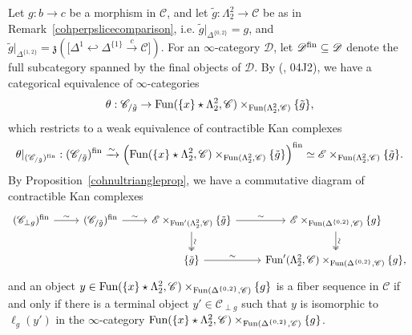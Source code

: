\documentclass{tac}
\newcommand{\f}[1]{\mathfrak{#1}}
\newcommand{\s}[1]{\mathscr{#1}}
\newcommand{\tx}[1]{\textnormal{#1}}
\begin{document}
\begin{rmk}
Let $g : b\to c$ be a morphism in $\s{C}$, and let $\tilde{g} : \Lambda^2_2 \to \s{C}$ be as in Remark~\ref{cohperpslicecomparison}, i.e. $\tilde{g}|_{\Delta^{\{0,2 \}}} =g$, and $\tilde{g}|_{\Delta^{\{1,2\}}} = \f{z} ( \big[ \Delta^1 \hookleftarrow \Delta^{\{1 \}} \xrightarrow{c} \s{C} \big] )$.  For an $\infty$-category $\s{D}$, let $\s{D}^\tx{fin} \subseteq \s{D}$ denote the full subcategory spanned by the final objects of $\s{D}$.  By (\cite{kerodon}, 04J2), we have a categorical equivalence of $\infty$-categories
\[ \theta : \s{C}_{/\tilde{g}} \to \tx{Fun}(\{ x \}\star \Lambda^2_2 ,  \s{C})\times_{\tx{Fun}(\Lambda^2_2 ,  \s{C})} \{ \tilde{g} \}, \]
which restricts to a weak equivalence of contractible Kan complexes
\[ \theta |_{(\s{C}_{/\tilde{g}})^\tx{fin}} : (\s{C}_{/\tilde{g}})^\tx{fin} \xrightarrow{\sim} \Big( \tx{Fun}(\{ x \}\star \Lambda^2_2 ,  \s{C})\times_{\tx{Fun}(\Lambda^2_2 ,  \s{C})} \{ \tilde{g} \} \Big)^\tx{fin} \simeq \s{E} \times_{\tx{Fun}(\Lambda^2_2 ,  \s{C})} \{ \tilde{g} \}. \]
By Proposition~\ref{cohnultriangleprop}, we have a commutative diagram of contractible Kan complexes
\[ \begin{tikzcd}
(\s{C}_{\perp g})^\tx{fin} \arrow[]{r}{\sim} & (\s{C}_{/\tilde{g}})^\tx{fin} \arrow[]{r}{\sim} &  \s{E}  \times_{ \tx{Fun}' (\Lambda^2_2 , \s{C}) } \{ \tilde{g} \} \arrow[]{r}{\sim} \arrow[two heads]{d}{\rotatebox[origin=c]{90}{$\sim$}} & \s{E} \times_{\tx{Fun}(\Delta^{\{0,2 \}} , \s{C})}   \{ g \} \arrow[two heads]{d}{\rotatebox[origin=c]{90}{$\sim$}} \\
& & \{ \tilde{g} \} \arrow[]{r}{\sim} & \tx{Fun}' (\Lambda^2_2 , \s{C})  \times_{\tx{Fun}(\Delta^{\{0,2 \}} , \s{C})} \{ g \} ,
\end{tikzcd}\]
and an object $y \in \tx{Fun}(\{x\} \star \Lambda^2_2 , \s{C})   \times_{\tx{Fun}(\Delta^{\{0,2 \}} , \s{C})} \{ g \}$ is a fiber sequence in $\s{C}$ if and only if there is a terminal object $y' \in \s{C}_{\perp g}$ such that $y$ is isomorphic to $\ell_g (y')$ in the $\infty$-category $\tx{Fun}(\{x\} \star \Lambda^2_2 , \s{C})   \times_{\tx{Fun}(\Delta^{\{0,2 \}} , \s{C})} \{ g \}$.
\end{rmk}

\end{document}
